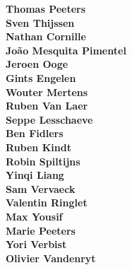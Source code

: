 \begin{multicols}{3}
\textbf{Thomas Peeters}\\
\textbf{Sven Thijssen}\\
\textbf{Nathan Cornille}\\
\textbf{Jo\~{a}o Mesquita Pimentel}\\
\textbf{Jeroen Ooge}\\
\textbf{Gints Engelen}\\
\textbf{Wouter Mertens}\\
\textbf{Ruben Van Laer}\\
\textbf{Seppe Lesschaeve}\\
\textbf{Ben Fidlers}\\
\textbf{Ruben Kindt}\\
\textbf{Robin Spiltijns}\\
\textbf{Yinqi Liang}\\
\textbf{Sam Vervaeck}\\
\textbf{Valentin Ringlet}\\
\textbf{Max Yousif}\\
\textbf{Marie Peeters}\\
\textbf{Yori Verbist}\\
\textbf{Olivier Vandenryt}\\
\end{multicols}
